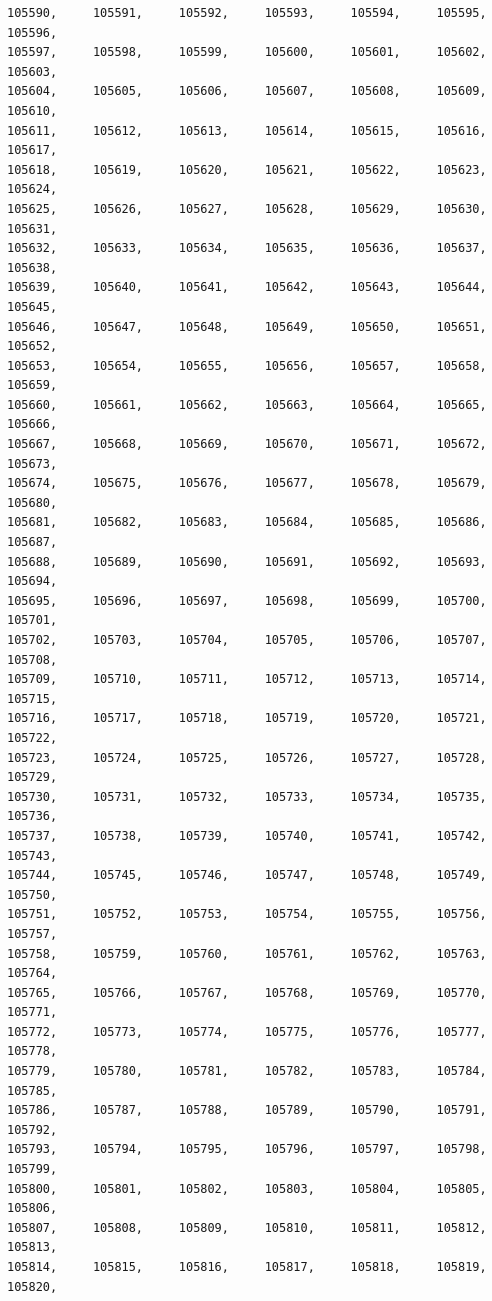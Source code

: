 \documentclass[a4paper,11pt]{report}
\begin{document}
\begin{verbatim}
105590,     105591,     105592,     105593,     105594,     105595,     105596,
105597,     105598,     105599,     105600,     105601,     105602,     105603,
105604,     105605,     105606,     105607,     105608,     105609,     105610,
105611,     105612,     105613,     105614,     105615,     105616,     105617,
105618,     105619,     105620,     105621,     105622,     105623,     105624,
105625,     105626,     105627,     105628,     105629,     105630,     105631,
105632,     105633,     105634,     105635,     105636,     105637,     105638,
105639,     105640,     105641,     105642,     105643,     105644,     105645,
105646,     105647,     105648,     105649,     105650,     105651,     105652,
105653,     105654,     105655,     105656,     105657,     105658,     105659,
105660,     105661,     105662,     105663,     105664,     105665,     105666,
105667,     105668,     105669,     105670,     105671,     105672,     105673,
105674,     105675,     105676,     105677,     105678,     105679,     105680,
105681,     105682,     105683,     105684,     105685,     105686,     105687,
105688,     105689,     105690,     105691,     105692,     105693,     105694,
105695,     105696,     105697,     105698,     105699,     105700,     105701,
105702,     105703,     105704,     105705,     105706,     105707,     105708,
105709,     105710,     105711,     105712,     105713,     105714,     105715,
105716,     105717,     105718,     105719,     105720,     105721,     105722,
105723,     105724,     105725,     105726,     105727,     105728,     105729,
105730,     105731,     105732,     105733,     105734,     105735,     105736,
105737,     105738,     105739,     105740,     105741,     105742,     105743,
105744,     105745,     105746,     105747,     105748,     105749,     105750,
105751,     105752,     105753,     105754,     105755,     105756,     105757,
105758,     105759,     105760,     105761,     105762,     105763,     105764,
105765,     105766,     105767,     105768,     105769,     105770,     105771,
105772,     105773,     105774,     105775,     105776,     105777,     105778,
105779,     105780,     105781,     105782,     105783,     105784,     105785,
105786,     105787,     105788,     105789,     105790,     105791,     105792,
105793,     105794,     105795,     105796,     105797,     105798,     105799,
105800,     105801,     105802,     105803,     105804,     105805,     105806,
105807,     105808,     105809,     105810,     105811,     105812,     105813,
105814,     105815,     105816,     105817,     105818,     105819,     105820,

\end{verbatim}
\end{document}

